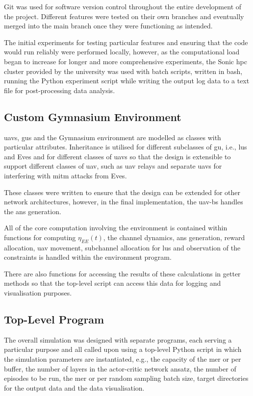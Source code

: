 Git was used for software version control throughout the entire development of the project. Different features were tested on their own branches and eventually merged into the main branch once they were functioning as intended. 

The initial experiments for testing particular features and ensuring that the code would run reliably were performed locally, however, as the computational load began to increase for longer and more comprehensive experiments, the Sonic \acrfull{hpc} cluster provided by the university was used with batch scripts, written in \acrshort{bash}, running the Python experiment script while writing the output log data to a text file for post-processing data analysis. 
\subsection{Custom Gymnasium Environment}
\acrshort{uav}s, \acrshort{gu}s and the Gymnasium environment are modelled as classes with particular attributes. 
Inheritance is utilised for different subclasses of \acrshort{gu}, i.e., \acrshort{lu}s and Eves and for different classes of \acrshort{uav}s so that the design is extensible to support different classes of \acrshort{uav}, such as \acrshort{uav} relays and separate \acrshort{uav}s for interfering with \acrshort{mitm} attacks from Eves. 

These classes were written to ensure that the design can be extended for other network architectures, however, in the final implementation, the \acrshort{uav}-\acrshort{bs} handles the \acrshort{ans} generation. 

All of the core computation involving the environment is contained within functions for computing $\eta_{EE} (t)$, the channel dynamics, \acrshort{ans} generation, reward allocation, \acrshort{uav} movement, subchannel allocation for \acrshort{lu}s and observation of the constraints is handled within the environment program. 

There are also functions for accessing the results of these calculations in getter methods so that the top-level script can access this data for logging and visualisation purposes. 
\subsection{Top-Level Program}
The overall simulation was designed with separate programs, each serving a particular purpose and all called upon using a top-level Python script in which the simulation parameters are instantiated, e.g., the capacity of the \acrfull{mer} or \acrfull{per} buffer, the number of layers in the actor-critic network ansatz, the number of episodes to be run, the \acrshort{mer} or \acrshort{per} random sampling batch size, target directories for the output data and the data visualisation.  

